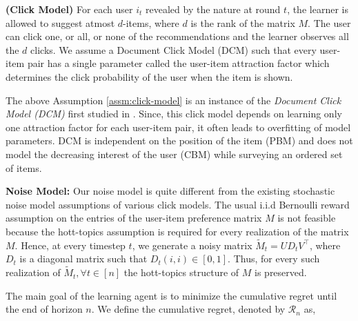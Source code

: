 \begin{assumption}\textbf{(Click Model)}
\label{assm:click-model}
For each user $i_t$ revealed by the nature at round $t$, the learner is allowed to suggest atmost $d$-items, where $d$ is the rank of the matrix $M$. The user can click one, or all, or none of the recommendations and the learner observes all the $d$ clicks. We assume a Document Click Model (DCM) such that every user-item pair has a single parameter called the user-item attraction factor which determines the click probability of the user when the item is shown.  
\end{assumption}

\begin{discussion}
The above Assumption \ref{assm:click-model} is an instance of the \textit{Document Click Model (DCM)} first studied in \citet{craswell2008experimental}. Since, this click model depends on learning only one attraction factor for each user-item pair, it often leads to overfitting of model parameters. DCM is independent on the position of the item (PBM) and does not model the decreasing interest of the user (CBM) while surveying an ordered set of  items. 
\end{discussion}


\textbf{Noise Model:} Our noise model is quite different from the existing stochastic noise model assumptions of various click models. The usual i.i.d Bernoulli reward assumption on the entries of the user-item preference matrix $M$ is not feasible because the hott-topics assumption is required for every realization of the matrix $M$. Hence,  at every timestep $t$, we generate a noisy matrix $\tilde{M}_t = UD_t V^{\intercal}$, where $D_t$ is a diagonal matrix such that $D_t(i,i)\in[0,1]$. Thus, for every such realization of $\tilde{M}_t, \forall t\in [n]$ the hott-topics structure of $M$ is preserved.

The main goal of the learning agent is to minimize the cumulative regret until the end of horizon $n$. We define the cumulative regret, denoted by $\mathcal{R}_n$ as,

